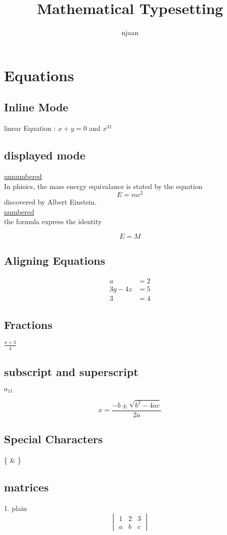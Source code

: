 \documentclass[12pt]{book}
\begin{document}
\title{Mathematical Typesetting}
\author{njaan}
\maketitle

\chapter{Equations}

\section{Inline Mode}

linear Equation : $ x+y=0 $ and $ x^{31} $ 

\section{displayed mode}
\underline{unnumbered}\\
In phisics, the mass energy equivalance is stated by the equation
$$ E=mc^2 $$ discovered by Albert Einstein.\\

\underline{numbered}\\

the formula express the identity

\begin{equation*}
E=M
\end{equation*}

\section{Aligning Equations}
\begin{align*}
a&= 2 \\
3y-4z&= 5 \\
3&= 4 
\end{align*}

\section{Fractions}



$ \displaystyle \frac{x+3}{4}$

\section{subscript and superscript}

$\displaystyle a_{11 } $

$$ x = \frac{-b \pm \sqrt{b^2-4ac}}{2a} $$

\section{Special Characters}

\{ \& \}


\section{matrices}

1. plain\\

$$
\begin{vmatrix}

1 & 2 & 3\\
a & b & c
\end{vmatrix}
$$
\end{document}
